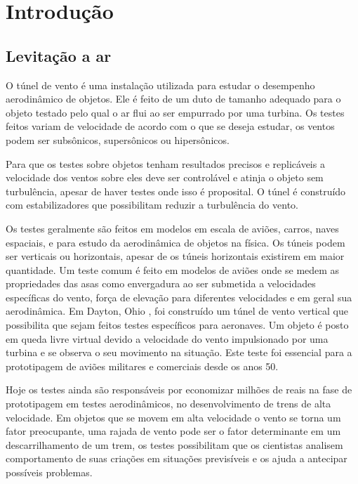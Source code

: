 
\chapter{Introdução} %

\section{Levitação a ar}

O túnel de vento é uma instalação utilizada para estudar o desempenho aerodinâmico de objetos. Ele é feito de um duto de tamanho adequado para o objeto testado pelo qual o ar flui ao ser empurrado por uma turbina. Os testes feitos variam de velocidade de acordo com o que se deseja estudar, os ventos podem ser subsônicos, supersônicos ou hipersônicos. 


Para que os testes sobre objetos tenham resultados precisos e replicáveis a velocidade dos ventos sobre eles deve ser controlável e atinja o objeto sem turbulência, apesar de haver testes onde isso é proposital. O túnel é construído com estabilizadores que possibilitam reduzir a turbulência do vento. 


Os testes geralmente são feitos em modelos em escala de aviões, carros, naves espaciais, e para  estudo da aerodinâmica de objetos na física. Os túneis podem ser verticais ou horizontais, apesar de os túneis horizontais existirem em maior quantidade. Um teste comum é feito em modelos de aviões onde se medem as propriedades das asas como envergadura ao ser submetida a velocidades específicas do vento, força de elevação para diferentes velocidades e em geral sua aerodinâmica. Em Dayton, Ohio\cite{vertical1946} , foi construído um túnel de vento vertical que possibilita que sejam feitos testes específicos para aeronaves. Um objeto é posto em queda livre virtual devido a velocidade do vento impulsionado por uma turbina e se observa o seu movimento na situação. Este teste foi essencial para a prototipagem de aviões militares e comerciais desde os anos 50.


Hoje os testes ainda são responsáveis por economizar milhões de reais na fase de prototipagem em testes aerodinâmicos, no desenvolvimento de trens de alta velocidade\cite{KWON2001}. Em objetos que se movem em alta velocidade o vento se torna um fator preocupante, uma rajada de vento pode ser o fator determinante em um descarrilhamento de um trem, os testes possibilitam que os cientistas analisem  comportamento de suas criações em situações previsíveis e os ajuda a antecipar possíveis problemas.

